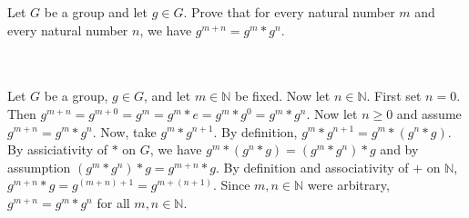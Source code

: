 Let $G$ be a group and let $g\in G$. Prove that for every natural number $m$ and every natural number
$n$, we have $g^{m+n}=g^m*g^n$.\\\\

\begin{solution}\renewcommand{\qedsymbol}{}\ \\
    Let $G$ be a group, $g\in G$, and let $m\in\mathbb{N}$ be fixed. Now let $n\in\mathbb{N}$. First set
    $n=0$. Then $g^{m+n}=g^{m+0}=g^m=g^m*e=g^m*g^0=g^m*g^n$. Now let $n\geq0$ and assume
    $g^{m+n}=g^m*g^n$. Now, take $g^m*g^{n+1}$. By definition, $g^m*g^{n+1}=g^m*(g^n*g)$. By
    assiciativity of $*$ on $G$, we have $g^m*(g^n*g)=(g^m*g^n)*g$ and by assumption
    $(g^m*g^n)*g=g^{m+n}*g$. By definition and associativity of $+$ on $\mathbb{N}$,
    $g^{m+n}*g=g^{(m+n)+1}=g^{m+(n+1)}$. Since $m,n\in\mathbb{N}$ were arbitrary,
    $g^{m+n}=g^m*g^n$ for all $m,n\in\mathbb{N}$.

\end{solution}